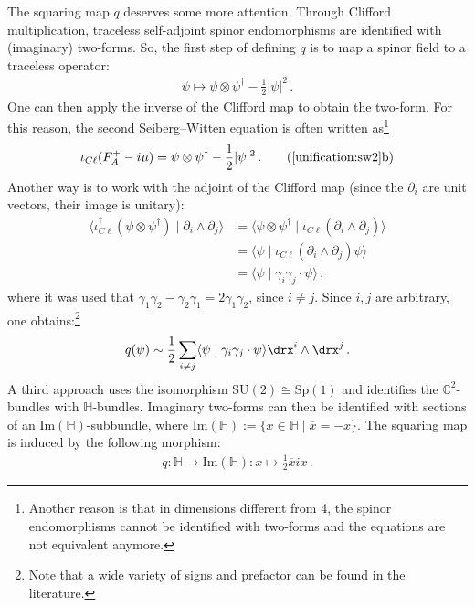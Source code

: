     \begin{construct}
        The squaring map $q$ deserves some more attention. Through Clifford multiplication, traceless self-adjoint spinor endomorphisms are identified with (imaginary) two-forms. So, the first step of defining $q$ is to map a spinor field to a traceless operator:
        \begin{gather}
            \psi\mapsto\psi\otimes\psi^\dagger - \frac{1}{2}|\psi|^2\,.
        \end{gather}
        One can then apply the inverse of the Clifford map to obtain the two-form. For this reason, the second Seiberg--Witten equation is often written as\footnote{Another reason is that in dimensions different from 4, the spinor endomorphisms cannot be identified with two-forms and the equations are not equivalent anymore.}
        \begin{gather}
            \iota_{C\ell}(F_A^+-i\mu) = \psi\otimes\psi^\dagger-\frac{1}{2}|\psi|^2\,.
            \tag{\ref*{unification:sw2}b}
        \end{gather}
        Another way is to work with the adjoint of the Clifford map (since the $\partial_i$ are unit vectors, their image is unitary):
        \begin{align*}
            \langle\iota_{C\ell}^\dagger(\psi\otimes\psi^\dagger)\mid\partial_i\wedge\partial_j\rangle &= \langle\psi\otimes\psi^\dagger\mid\iota_{C\ell}(\partial_i\wedge\partial_j)\rangle\\
            &= \langle\psi\mid\iota_{C\ell}(\partial_i\wedge\partial_j)\psi\rangle\\
            &= \langle\psi\mid\gamma_i\gamma_j\cdot\psi\rangle\,,
        \end{align*}
        where it was used that $\gamma_1\gamma_2-\gamma_2\gamma_1=2\gamma_1\gamma_2$, since $i\neq j$. Since $i,j$ are arbitrary, one obtains:\footnote{Note that a wide variety of signs and prefactor can be found in the literature.}
        \begin{gather}
            q(\psi)\sim\frac{1}{2}\sum_{i\neq j}\langle\psi\mid\gamma_i\gamma_j\cdot\psi\rangle\drx^i\wedge\drx^j\,.
        \end{gather}
        A third approach uses the isomorphism $\mathrm{SU}(2)\cong\mathrm{Sp}(1)$ and identifies the $\mathbb{C}^2$-bundles with $\mathbb{H}$-bundles. Imaginary two-forms can then be identified with sections of an $\mathrm{Im}(\mathbb{H})$-subbundle, where $\mathrm{Im}(\mathbb{H}):=\{x\in\mathbb{H}\mid\overline{x}=-x\}$. The squaring map is induced by the following morphism:
        \begin{gather}
            q:\mathbb{H}\rightarrow\mathrm{Im}(\mathbb{H}):x\mapsto\frac{1}{2}\overline{x}ix\,.
        \end{gather}
    \end{construct}

